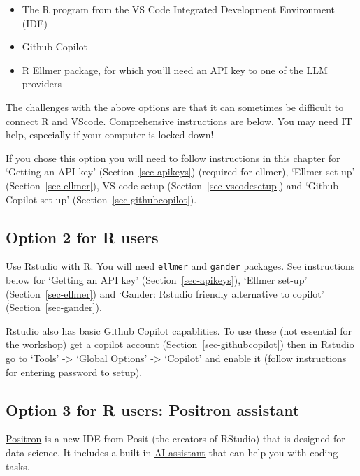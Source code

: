 \documentclass[
  letterpaper,
  DIV=11,
  numbers=noendperiod]{scrreprt}
\providecommand{\tightlist}{%
  \setlength{\itemsep}{0pt}\setlength{\parskip}{0pt}}
\begin{document}
\begin{itemize}
\tightlist
\item
  The R program from the VS Code Integrated Development Environment
  (IDE)
\item
  Github Copilot
\item
  R Ellmer package, for which you'll need an API key to one of the LLM
  providers
\end{itemize}

The challenges with the above options are that it can sometimes be
difficult to connect R and VScode. Comprehensive instructions are below.
You may need IT help, especially if your computer is locked down!

If you chose this option you will need to follow instructions in this
chapter for `Getting an API key' (Section~\ref{sec-apikeys}) (required
for ellmer), `Ellmer set-up' (Section~\ref{sec-ellmer}), VS code setup
(Section~\ref{sec-vscodesetup}) and `Github Copilot set-up'
(Section~\ref{sec-githubcopilot}).

\subsection{Option 2 for R users}\label{option-2-for-r-users}

Use Rstudio with R. You will need \texttt{ellmer} and \texttt{gander}
packages. See instructions below for `Getting an API key'
(Section~\ref{sec-apikeys}), `Ellmer set-up' (Section~\ref{sec-ellmer})
and `Gander: Rstudio friendly alternative to copilot'
(Section~\ref{sec-gander}).

Rstudio also has basic Github Copilot capablities. To use these (not
essential for the workshop) get a copilot account
(Section~\ref{sec-githubcopilot}) then in Rstudio go to `Tools'
-\textgreater{} `Global Options' -\textgreater{} `Copilot' and enable it
(follow instructions for entering password to setup).

\subsection{Option 3 for R users: Positron
assistant}\label{option-3-for-r-users-positron-assistant}

\href{https://positron.posit.co/}{Positron} is a new IDE from Posit (the
creators of RStudio) that is designed for data science. It includes a
built-in \href{https://positron.posit.co/assistant.html}{AI assistant}
that can help you with coding tasks.
\end{document}
